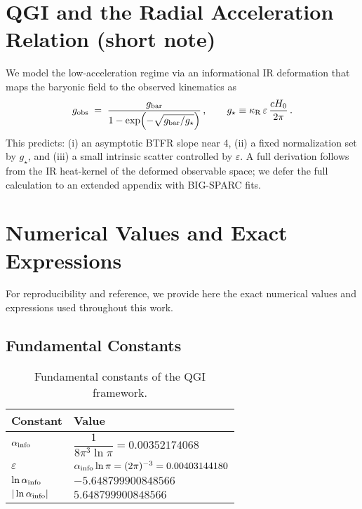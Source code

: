 \documentclass{article}
\numberwithin{equation}{section}
\theoremstyle{plain}
\theoremstyle{definition}
\theoremstyle{remark}
\newcommand{\ainfoapprox}{0.00352174068}
\newcommand{\epsapprox}{0.00403144180}
\begin{document}
\section{QGI and the Radial Acceleration Relation (short note)}
\label{sec:qgi-rar}

We model the low-acceleration regime via an informational IR deformation that maps the baryonic field to the observed kinematics as
\begin{equation}
g_{\rm obs} \;=\; \frac{g_{\rm bar}}{1-\exp\!\left(-\sqrt{g_{\rm bar}/g_\star}\right)}\,,\qquad
g_\star \equiv \kappa_{\rm R}\,\varepsilon\,\frac{cH_0}{2\pi}\,.
\end{equation}
This predicts: (i) an asymptotic BTFR slope near 4, (ii) a fixed normalization set by $g_\star$, and (iii) a small intrinsic scatter controlled by $\varepsilon$.
A full derivation follows from the IR heat-kernel of the deformed observable space; we defer the full calculation to an extended appendix with BIG-SPARC fits.

\section{Numerical Values and Exact Expressions}
\label{app:numerical_values}

For reproducibility and reference, we provide here the exact numerical values and expressions used throughout this work.

\subsection{Fundamental Constants}
\begin{table}[H]
\centering
\small
\begin{tabular}{ll}
\toprule
Constant & Value \\
\midrule
$\alpha_{\rm info}$ & $\dfrac{1}{8\pi^3\ln\pi} = \ainfoapprox$ \\
$\varepsilon$ & $\alpha_{\rm info}\ln\pi = (2\pi)^{-3} = \epsapprox$ \\
$\ln\alpha_{\rm info}$ & $-5.648799900848566$ \\
$|\ln\alpha_{\rm info}|$ & $5.648799900848566$ \\
\bottomrule
\end{tabular}
\caption{Fundamental constants of the QGI framework.}
\end{table}
\end{document}
